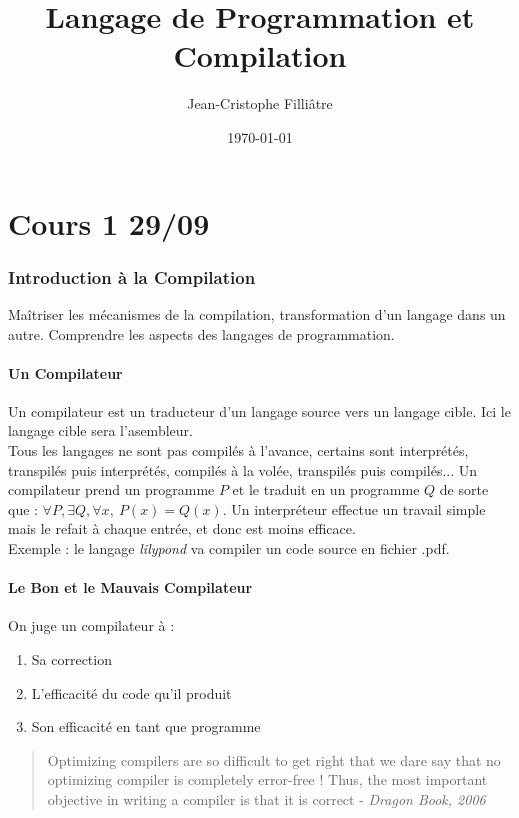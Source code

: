 \documentclass{cours}
\title{Langage de Programmation et Compilation}
\author{Jean-Cristophe Filliâtre}
\date{\today}
\begin{document}
\newpage
\part[Aperçu de la Compilation - Assembleur x86-64]{Cours 1 29/09}
\localtableofcontents
\section{Introduction à la Compilation}
Maîtriser les mécanismes de la compilation, transformation d'un langage dans un autre. Comprendre les aspects des langages de programmation.\\

\subsection{Un Compilateur}
Un compilateur est un traducteur d'un langage source vers un langage cible. Ici le langage cible sera l'asembleur. \\
Tous les langages ne sont pas compilés à l'avance, certains sont interprétés, transpilés puis interprétés, compilés à la volée, transpilés puis compilés...
Un compilateur prend un programme $P$ et le traduit en un programme $Q$ de sorte que : $\forall P, \exists Q, \forall x, \ P(x) = Q(x)$. Un interpréteur effectue un travail simple mais le refait à chaque entrée, et donc est moins efficace.\\
Exemple : le langage \textsl{lilypond} va compiler un code source en fichier .pdf. \\

\subsection{Le Bon et le Mauvais Compilateur}
On juge un compilateur à : \begin{enumerate}
    \item Sa correction
    \item L'efficacité du code qu'il produit
    \item Son efficacité en tant que programme
\end{enumerate}
\begin{quote}
    \og Optimizing compilers are so difficult to get right that we dare say that no optimizing compiler is completely error-free ! Thus, the most important objective in writing a compiler is that it is correct \fg - \textit{Dragon Book, 2006}
\end{quote}
\end{document}
